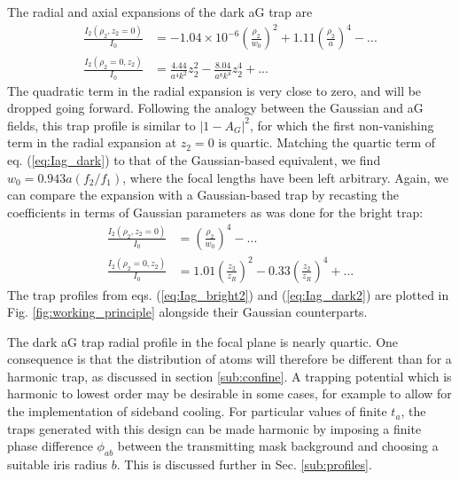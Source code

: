 The radial and axial expansions of the dark aG trap are  
\begin{equation} \label{eq:Iag_dark}
    \begin{aligned}
    \frac{I_2(\rho_2,z_2=0)}{I_0} &= -1.04\times10^{-6} \left(\frac{\rho_2}{w_0}\right)^2 + 1.11 \left(\frac{\rho_2}{a}\right)^4 - ... \\
    \frac{I_2(\rho_2=0,z_2)}{I_0} &= \frac{4.44}{a^4 k^2}z_2^2 - \frac{8.04 }{a^8 k^4}z_2^4 + ...
    \end{aligned}
\end{equation}
 The quadratic term in the radial expansion is very close to zero, and will be dropped going forward. Following the analogy between the Gaussian and aG fields, this trap profile is similar to $|1 - A_G|^2$, for which the first non-vanishing term in the radial expansion at $z_2=0$ is quartic. Matching the quartic term of eq. (\ref{eq:Iag_dark}) to that of the Gaussian-based equivalent, we find $w_0=0.943a(f_2/f_1)$, where the focal lengths have been left arbitrary. Again, we can compare the expansion with a Gaussian-based trap by recasting the coefficients in terms of Gaussian parameters as was done for the bright trap:
\begin{equation} \label{eq:Iag_dark2}
    \begin{aligned}
    \frac{I_2(\rho_2,z_2=0)}{I_0} &= \left(\frac{\rho_2}{w_0}\right)^4 - ... \\
    \frac{I_2(\rho_2=0,z_2)}{I_0} &= 1.01\left(\frac{z_2}{z_R}\right)^2 - 0.33 \left(\frac{z_2}{z_R}\right)^4 + ...
    \end{aligned}
\end{equation}
The trap profiles from eqs. (\ref{eq:Iag_bright2}) and (\ref{eq:Iag_dark2}) are plotted in Fig. \ref{fig:working_principle} alongside their Gaussian counterparts.

The dark aG trap radial profile in the focal plane is nearly quartic. One consequence is that the distribution of atoms will therefore be different than for a harmonic trap, as discussed in section \ref{sub:confine}. A trapping potential which is harmonic to lowest order may be desirable in some cases, for example to allow for the implementation of sideband cooling\cite{Wineland1979}. For particular values of finite $t_a$, the traps generated with this design can be made harmonic by imposing a finite phase difference $\phi_{ab}$ between the transmitting mask background and choosing a suitable iris radius $b$. This is discussed further in Sec. \ref{sub:profiles}.

